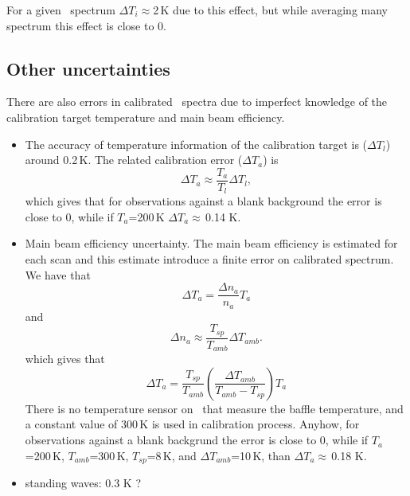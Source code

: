 For a given \smr\ spectrum \(\Delta T_{i}\)\(\approx\)2\,K due to this effect,
but while averaging many spectrum this effect is close to 0.





\subsection{Other uncertainties}
\label{sec:otheruncer}

There are also errors in calibrated \smr\ spectra due to imperfect knowledge of
the calibration target temperature and main beam efficiency. 

\begin{itemize}

\item The accuracy of temperature information of the calibration target
 is (\(\Delta T_{l}\)) around 0.2\,K. The related calibration error (\(\Delta T_{a}\)) is
 \begin{equation}
  \Delta T_{a} \approx \frac{T_{a}}{T_{l}} \Delta T_{l},
 \end{equation}
 which gives that for observations against a blank background the error
 is close to 0, while if \(T_{a}\)=200\,K \(\Delta T_{a}\)\(\approx\)\,0.14 K.

\item Main beam efficiency uncertainty. The main beam efficiency is estimated
 for each scan and this estimate introduce a finite error on calibrated spectrum.
 We have that
 \begin{equation}
  \Delta T_{a} = \frac{\Delta n_{a}}{n_{a}}T_{a}
 \end{equation}
 and
 \begin{equation}
  \Delta n_{a} \approx \frac{T_{sp}}{T_{amb}}\Delta{T_{amb}}.
 \end{equation}
  which gives that
 \begin{equation}
  \Delta T_{a} = \frac{T_{sp}}{T_{amb}}\left(\frac{\Delta T_{amb}}{T_{amb}-T_{sp}}\right)T_{a}
 \end{equation}
 There is no temperature sensor on \smr\ that measure the baffle temperature, and a constant
 value of 300\,K is used in calibration process.
 Anyhow, for  observations against a blank backgrund the error
 is close to 0, while if \(T_{a}\)=200\,K, \(T_{amb}\)=300\,K, \(T_{sp}\)=8\,K,
 and \(\Delta T_{amb}\)=10\,K, than \(\Delta T_{a}\)\(\approx\)\,0.18 K.


\item standing waves: 0.3 K ?


\end{itemize}


